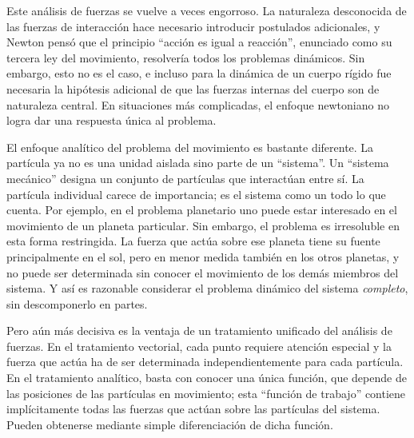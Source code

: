 \documentclass[12pt,a4paper]{book}
\begin{document}
Este an\'alisis de fuerzas se vuelve a veces engorroso. La naturaleza desconocida de las fuerzas de interacci\'on hace necesario introducir postulados adicionales, y Newton pens\'o que el principio ``acci\'on es igual a reacci\'on'', enunciado como su tercera ley del movimiento, resolver\'ia todos los problemas din\'amicos. Sin embargo, esto no es el caso, e incluso para la din\'amica de un cuerpo r\'igido fue necesaria la hip\'otesis adicional de que las fuerzas internas del cuerpo son de naturaleza central. En situaciones m\'as complicadas, el enfoque newtoniano no logra dar una respuesta \'unica al problema.

El enfoque anal\'itico del problema del movimiento es bastante diferente. La part\'icula ya no es una unidad aislada sino parte de un ``sistema''. Un ``sistema mec\'anico'' designa un conjunto de part\'iculas que interact\'uan entre s\'i. La part\'icula individual carece de importancia; es el sistema como un todo lo que cuenta. Por ejemplo, en el problema planetario uno puede estar interesado en el movimiento de un planeta particular. Sin embargo, el problema es irresoluble en esta forma restringida. La fuerza que act\'ua sobre ese planeta tiene su fuente principalmente en el sol, pero en menor medida tambi\'en en los otros planetas, y no puede ser determinada sin conocer el movimiento de los dem\'as miembros del sistema. Y as\'i es razonable considerar el problema din\'amico del sistema \textit{completo}, sin descomponerlo en partes.

Pero a\'un m\'as decisiva es la ventaja de un tratamiento unificado del an\'alisis de fuerzas. En el tratamiento vectorial, cada punto requiere atenci\'on especial y la fuerza que act\'ua ha de ser determinada independientemente para cada part\'icula. En el tratamiento anal\'itico, basta con conocer una \'unica funci\'on, que depende de las posiciones de las part\'iculas en movimiento; esta ``funci\'on de trabajo'' contiene impl\'icitamente todas las fuerzas que act\'uan sobre las part\'iculas del sistema. Pueden obtenerse mediante simple diferenciaci\'on de dicha funci\'on.
\end{document}
